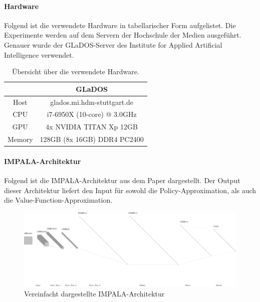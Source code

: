 \paragraph{Hardware} \label{hardware}
Folgend ist die verwendete Hardware in tabellarischer Form aufgelistet. Die Experimente werden auf dem Servern der Hochschule der Medien ausgeführt. Genauer wurde der GLaDOS-Server des Institute for Applied Artificial Intelligence verwendet. 

\begin{center}
 \begin{table}[htb!]
 \begin{center}
  \begin{tabular}{c | c}
    \hline
     	 				& GLaDOS   \\ \hline 
     Host 				& glados.mi.hdm-stuttgart.de        \\ \hline 
     CPU 				& i7-6950X (10-core) @ 3.0GHz \\ \hline 
     GPU				& 4x NVIDIA TITAN Xp 12GB        \\ \hline 
     Memory			& 128GB (8x 16GB) DDR4 PC2400 \\ \hline 
     
    \hline
  \end{tabular}
  \caption{Übersicht über die verwendete Hardware.}
  \label{tab:tab_durch_EXP_trainSetting3}
  \end{center}
 \end{table}
\end{center} 
\null\newpage

\paragraph{IMPALA-Architektur}\label{anh_impala_arch} \hfill \break
Folgend ist die IMPALA-Architektur aus dem Paper \cite{espeholt2018impala} dargestellt. Der Output dieser Architektur liefert den Input für sowohl die Policy-Approximation, als auch die Value-Function-Approximation.
\begin{figure}[htb!]
    \begin{minipage}{\linewidth}
        \centering
        \includegraphics[angle=90,origin=c,scale=0.3]{abb/_networkArch/impala_net_arch}
        \caption*{Vereinfacht dargestellte IMPALA-Architektur}
        \label{fig:pic_impala_net_arch}
    \end{minipage}
\end{figure}
\vfill


